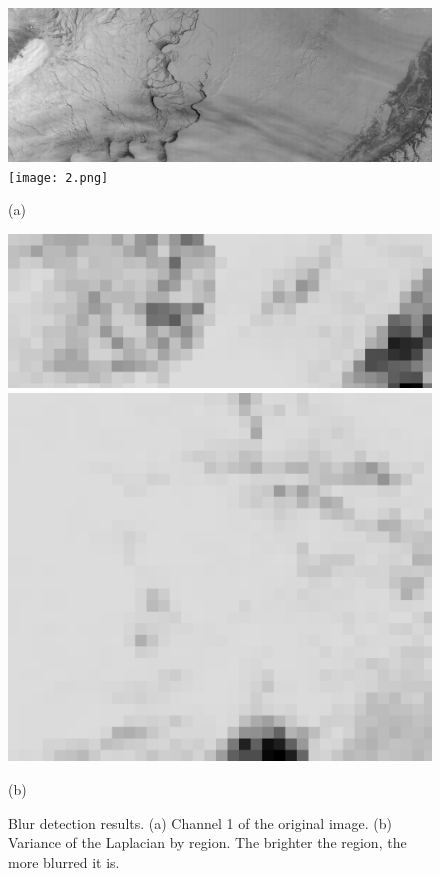 \documentclass{article}
\begin{document}
        \begin{figure}[ht]
            \centering
            \begin{minipage}{0.49\hsize}
                \centering
                \includegraphics[width = 1\hsize]{1.png}
                \texttt{[image: 2.png]}
                \caption*{(a)}
            \end{minipage}
            \begin{minipage}{0.49\hsize}
                \centering
                \includegraphics[width = 1\hsize]{1_blur.png}
                \includegraphics[width = 1\hsize]{2_blur.png}
                \caption*{(b)}
            \end{minipage}
            \caption{
                Blur detection results.
                (a) Channel 1 of the original image.
                (b) Variance of the Laplacian by region.
                The brighter the region, the more blurred it is.
            }
            \label{fig:blur}
        \end{figure}
\end{document}
